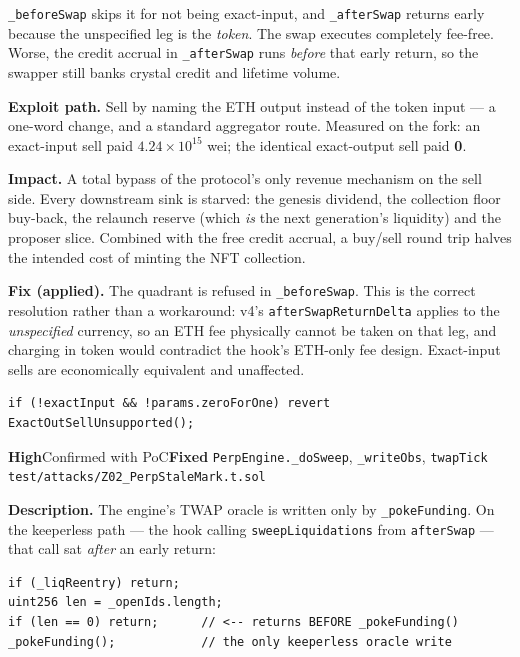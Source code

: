 \documentclass[10pt,a4paper]{article}
\newcommand{\sev}[2]{\textcolor{#1}{\textbf{#2}}}
\newcommand{\SevHigh}{\sev{high}{High}}
\newcommand{\Fixed}{\textcolor{ok}{\textbf{Fixed}}}
\newcommand{\code}[1]{\texttt{\small #1}}
\begin{document}
\code{\_beforeSwap} skips it for not being exact-input, and \code{\_afterSwap} returns
early because the unspecified leg is the \emph{token}. The swap executes completely
fee-free. Worse, the credit accrual in \code{\_afterSwap} runs \emph{before} that early
return, so the swapper still banks crystal credit and lifetime volume.

\textbf{Exploit path.} Sell by naming the ETH output instead of the token input --- a
one-word change, and a standard aggregator route. Measured on the fork: an exact-input
sell paid $4.24\times10^{15}$ wei; the identical exact-output sell paid \textbf{0}.

\textbf{Impact.} A total bypass of the protocol's only revenue mechanism on the sell side.
Every downstream sink is starved: the genesis dividend, the collection floor buy-back, the
relaunch reserve (which \emph{is} the next generation's liquidity) and the proposer
slice. Combined with the free credit accrual, a buy/sell round trip halves the intended
cost of minting the NFT collection.

\textbf{Fix (applied).} The quadrant is refused in \code{\_beforeSwap}. This is the
correct resolution rather than a workaround: v4's \code{afterSwapReturnDelta} applies to
the \emph{unspecified} currency, so an ETH fee physically cannot be taken on that leg, and
charging in token would contradict the hook's ETH-only fee design. Exact-input sells are
economically equivalent and unaffected.

\begin{lstlisting}
if (!exactInput && !params.zeroForOne) revert ExactOutSellUnsupported();
\end{lstlisting}

{\SevHigh}{Confirmed with PoC}{\Fixed}
{\code{PerpEngine.\_doSweep}, \code{\_writeObs}, \code{twapTick}}
{\code{test/attacks/Z02\_PerpStaleMark.t.sol}}

\textbf{Description.} The engine's TWAP oracle is written only by \code{\_pokeFunding}.
On the keeperless path --- the hook calling \code{sweepLiquidations} from
\code{afterSwap} --- that call sat \emph{after} an early return:

\begin{lstlisting}
if (_liqReentry) return;
uint256 len = _openIds.length;
if (len == 0) return;      // <-- returns BEFORE _pokeFunding()
_pokeFunding();            // the only keeperless oracle write
\end{lstlisting}
\end{document}
